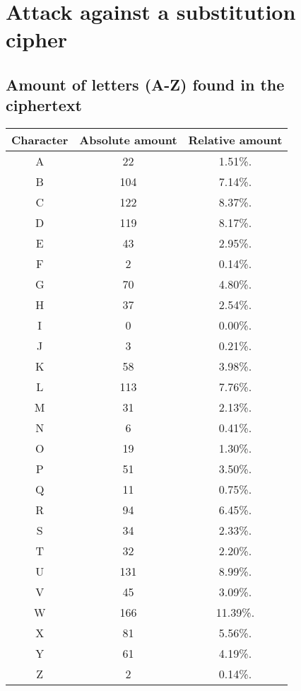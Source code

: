 \section{Attack against a substitution cipher}
\label{section:atk_subst_cipher}

\subsection{Amount of letters (A-Z) found in the ciphertext}
\label{section:1a}
\begin{center}
	\begin{tabular}{ | c | c | c | } \hline 
		Character & Absolute amount & Relative amount \\ \hline
		A & 22 & 1.51\%. \\ \hline
		B & 104 & 7.14\%. \\ \hline
		C & 122 & 8.37\%. \\ \hline
		D & 119 & 8.17\%. \\ \hline
		E & 43 & 2.95\%. \\ \hline
		F & 2 & 0.14\%. \\ \hline
		G & 70 & 4.80\%. \\ \hline
		H & 37 & 2.54\%. \\ \hline
		I & 0 & 0.00\%. \\ \hline
		J & 3 & 0.21\%. \\ \hline
		K & 58 & 3.98\%. \\ \hline
		L & 113 & 7.76\%. \\ \hline
		M & 31 & 2.13\%. \\ \hline
		N & 6 & 0.41\%. \\ \hline
		O & 19 & 1.30\%. \\ \hline
		P & 51 & 3.50\%. \\ \hline
		Q & 11 & 0.75\%. \\ \hline
		R & 94 & 6.45\%. \\ \hline
		S & 34 & 2.33\%. \\ \hline
		T & 32 & 2.20\%. \\ \hline
		U & 131 & 8.99\%. \\ \hline
		V & 45 & 3.09\%. \\ \hline
		W & 166 & 11.39\%. \\ \hline
		X & 81 & 5.56\%. \\ \hline
		Y & 61 & 4.19\%. \\ \hline
		Z & 2 & 0.14\%. \\ \hline
	\end{tabular}
\end{center}

